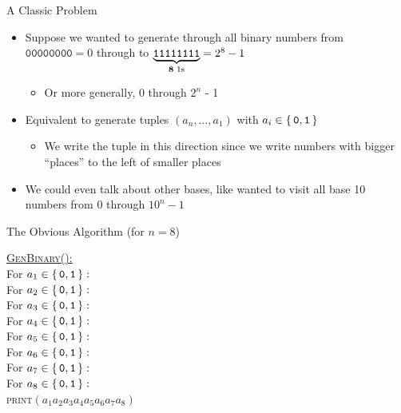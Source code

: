 \documentclass[aspectratio=169]{beamer}
\begin{document}
\begin{frame}{A Classic Problem}
    \begin{itemize}
        \item Suppose we wanted to \textcolor{sigma@mainblue}{generate} through all binary numbers from $\texttt{00000000} = 0$ through to $\underbrace{\texttt{11111111}}_{\textbf{8}\text{ 1s}} = 2^{\boldmath 8} - 1$ 
        \begin{itemize}
            \item Or more generally, $0$ through $2^n$ - 1 \pause
        \end{itemize}
        \item Equivalent to generate tuples $(a_n, \ldots, a_1)$ with $a_i \in \set{ \texttt{0}, \texttt{1}}$
        \begin{itemize}
            \item We write the tuple in this direction since we write numbers with bigger ``places'' to the left of smaller places \pause
        \end{itemize}
        \item We could even talk about other bases, like wanted to visit all base 10 numbers from $0$ through $10^n - 1$
    \end{itemize}
\end{frame}

\begin{frame}{The Obvious Algorithm (for $n = 8$)}
    \pause
    \begin{algo}
    \underline{\textsc{GenBinary}():}\+
    \\  For $a_1 \in \set{\texttt{0}, \texttt{1}}:$\+
    \\      For $a_2 \in \set{\texttt{0}, \texttt{1}}:$\+
    \\          For $a_3 \in \set{\texttt{0}, \texttt{1}}:$\+
    \\              For $a_4 \in \set{\texttt{0}, \texttt{1}}:$\+
    \\                  For $a_5 \in \set{\texttt{0}, \texttt{1}}:$\+
    \\                      For $a_6 \in \set{\texttt{0}, \texttt{1}}:$\+
    \\                          For $a_7 \in \set{\texttt{0}, \texttt{1}}:$\+
    \\                              For $a_8 \in \set{\texttt{0}, \texttt{1}}:$\+
    \\                                  \textsc{print}$(a_1 a_2 a_3 a_4 a_5 a_6 a_7 a_8)$
    \end{algo}
\end{frame}
\end{document}
